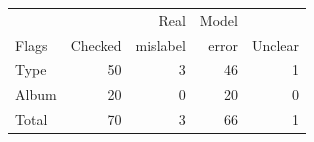 \begin{tabular}{@{}lrrrr@{}}
\toprule
 & & Real & Model & \\
Flags & Checked & mislabel & error & Unclear \\
\midrule
Type & 50 & 3 & 46 & 1 \\
Album & 20 & 0 & 20 & 0 \\
\midrule
Total & 70 & 3 & 66 & 1 \\
\bottomrule
\end{tabular}
